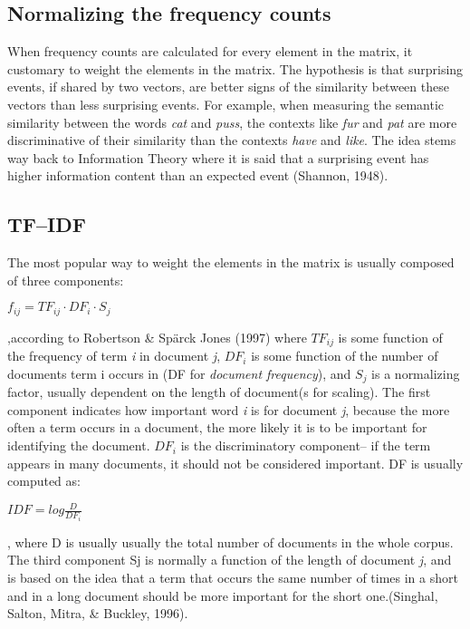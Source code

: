 \subsection{Normalizing the frequency counts}
When frequency counts are calculated for every element in the matrix, it customary to weight the elements in the matrix. The hypothesis is that surprising events, if shared by two vectors, are better signs of the similarity between these vectors than less surprising events. For example, when measuring the semantic similarity between the words \textit{cat} and \textit{puss}, the contexts like \textit{fur} and \textit{pat} are more discriminative of their similarity than the contexts \textit{have} and \textit{like}. The idea stems way back to Information Theory where it is said that a surprising event has higher information content than an expected event (Shannon, 1948).
\subsection{TF--IDF}
The most popular way to weight the elements in the matrix is usually composed of three components:
\begin{center}
\large{
$f_{ij} = TF_{ij} \cdot DF_{i} \cdot S_{j}$
}
\end{center}
,according to Robertson \& Sp\"{a}rck Jones (1997) where $TF_{ij}$  is some function of the frequency of term \textit{i} in document \textit{j}, $DF_{i}$ is some function of the number of documents term i occurs in (DF for \textit{document frequency}), and $S_{j}$ is a normalizing factor, usually dependent on the length of document(s for scaling).
The first component indicates how important word \textit{i} is for document \textit{j}, because the more often a term occurs in a document, the more likely it is to be important for identifying the document. $DF_{i}$ is the discriminatory component-- if the term appears in many documents, it should not be considered important. DF is usually computed as:
\begin{center}\large{
$IDF = log \frac{D}{DF_{i}}$
}
\end{center}
, where D is usually usually the total number of documents in the whole corpus. The third component Sj 
is normally a function of the length of document \textit{j}, and is based on the idea that a term that 
occurs the same number of times in a short and in a long document should be more important for the 
short one.(Singhal, Salton, Mitra, \& Buckley, 1996). 

